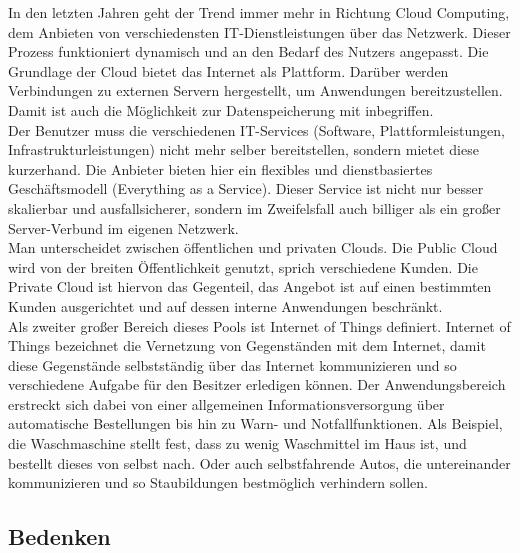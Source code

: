 \documentclass[letterpaper, 12pt]{article}
\let\tempsubsection\subsection
\renewcommand\subsection[1]{\vspace{0cm}\tempsubsection{#1}\vspace{0cm}}
\begin{document}
In den letzten Jahren geht der Trend immer mehr in Richtung Cloud Computing, dem Anbieten von verschiedensten IT-Dienstleistungen über das Netzwerk. Dieser Prozess funktioniert dynamisch und an den Bedarf des Nutzers angepasst. Die Grundlage der Cloud bietet das Internet als Plattform. Darüber werden Verbindungen zu externen Servern hergestellt, um Anwendungen bereitzustellen. Damit ist auch die Möglichkeit zur Datenspeicherung mit inbegriffen. \\
Der Benutzer muss die verschiedenen IT-Services (Software, Plattformleistungen, Infrastrukturleistungen) nicht mehr selber bereitstellen, sondern mietet diese kurzerhand. Die Anbieter bieten hier ein flexibles und dienstbasiertes Geschäftsmodell (Everything as a Service). Dieser Service ist nicht nur besser skalierbar und ausfallsicherer, sondern im Zweifelsfall auch billiger als ein großer Server-Verbund im eigenen Netzwerk. \\
Man unterscheidet zwischen öffentlichen und privaten Clouds. Die Public Cloud wird von der breiten Öffentlichkeit genutzt, sprich verschiedene Kunden. Die Private Cloud ist hiervon das Gegenteil, das Angebot ist auf einen bestimmten Kunden ausgerichtet und auf dessen interne Anwendungen beschränkt. \\
Als zweiter großer Bereich dieses Pools ist Internet of Things definiert. Internet of Things bezeichnet die Vernetzung von Gegenständen mit dem Internet, damit diese Gegenstände selbstständig über das Internet kommunizieren und so verschiedene Aufgabe für den Besitzer erledigen können. Der Anwendungsbereich erstreckt sich dabei von einer allgemeinen Informationsversorgung über automatische Bestellungen bis hin zu Warn- und Notfallfunktionen. Als Beispiel, die Waschmaschine stellt fest, dass zu wenig Waschmittel im Haus ist, und bestellt dieses von selbst nach. Oder auch selbstfahrende Autos, die untereinander kommunizieren und so Staubildungen bestmöglich verhindern sollen. \cite{cloud, iot}

\subsection{Bedenken}
\end{document}
